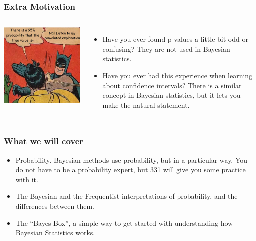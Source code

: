 \documentclass{beamer}
\begin{document}
\begin{frame}
\frametitle{Extra Motivation}

    \begin{columns} %
        \includegraphics[width=1\linewidth]{images/superman.png}

        \begin{itemize}
        \item Have you ever found p-values a little bit odd or confusing?
              They are not used in Bayesian statistics.
        \item Have you ever had this experience when learning about confidence
              intervals? There is a similar concept in Bayesian statistics,
              but it lets you make the natural statement.
        \end{itemize}
     \end{columns}

\end{frame}


\begin{frame}
\frametitle{What we will cover}
\begin{itemize}
\item Probability. Bayesian methods use probability, but in a particular way.
You do not have to be a probability expert, but 331 will give you some practice with it.\pause \\[0.5em]

\item The Bayesian and the Frequentist interpretations of probability, and the differences between them.\pause \\[0.5em]

\item The ``Bayes Box'', a simple way to get started with understanding how Bayesian Statistics works.
\end{itemize}
\end{frame}
\end{document}
